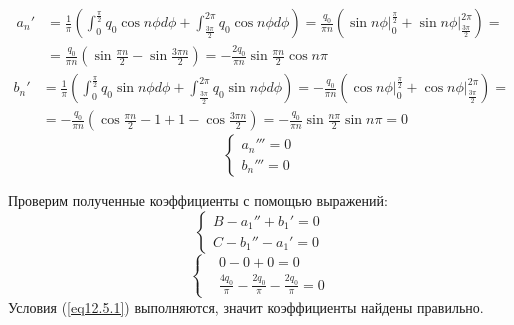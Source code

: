 \begin{equation}
    \label{eq12.1}
    \begin{split}
        a_n' & = \frac{1}{\pi} \left( \int_{0}^{\frac{\pi}{2}} q_0 \cos n\phi d\phi + \int_{\frac{3\pi}{2}}^{2\pi} q_0\cos n\phi d\phi \right) = \frac{q_0}{\pi n} \left( \sin n \phi \big|_{0}^{\frac{\pi}{2}} + \sin n \phi \big|_{\frac{3\pi}{2}}^{2\pi} \right) = 
        \\
        & = \frac{q_0}{\pi n} \left( \sin \frac{\pi n}{2} - \sin \frac{3\pi n}{2} \right) = - \frac{2q_0}{\pi n} \sin \frac{\pi n}{2} \cos n\pi
    \end{split}
\end{equation}
\begin{equation}
    \label{eq12.2}
    \begin{split}
        b_n' & = \frac{1}{\pi} \left( \int_{0}^{\frac{\pi}{2}} q_0 \sin n\phi d\phi + \int_{\frac{3\pi}{2}}^{2\pi} q_0 \sin n\phi d\phi \right) = -\frac{q_0}{\pi n} \left( \cos n\phi \big|_{0}^{\frac{\pi}{2}} + \cos n\phi \big|_{\frac{3\pi}{2}}^{2\pi} \right) =
        \\
        & = -\frac{q_0}{\pi n} \left( \cos \frac{\pi n}{2} - 1 + 1 - \cos \frac{3\pi n}{2} \right) = - \frac{q_0}{\pi n} \sin \frac{n\pi}{2} \sin n\pi = 0
    \end{split}
\end{equation}
\begin{equation}
    \label{eq12.5}
    \begin{cases}
        a_n''' = 0
        \\
        b_n''' = 0
    \end{cases}
\end{equation}

Проверим полученные коэффициенты с помощью выражений:
\begin{equation}
    \label{eq12.5.1}
    \begin{cases}
        B - a_1'' + b_1' = 0
        \\
        C - b_1'' - a_1' = 0
    \end{cases}
\end{equation}
\begin{equation}
    \label{eq12.5.2}
    \begin{cases}
        & 0 - 0 + 0 = 0
        \\[10pt]
        & \displaystyle \frac{4q_0}{\pi} - \frac{2q_0}{\pi} - \frac{2q_0}{\pi} = 0
    \end{cases}
\end{equation}
Условия (\ref{eq12.5.1}) выполняются, значит коэффициенты найдены правильно.

